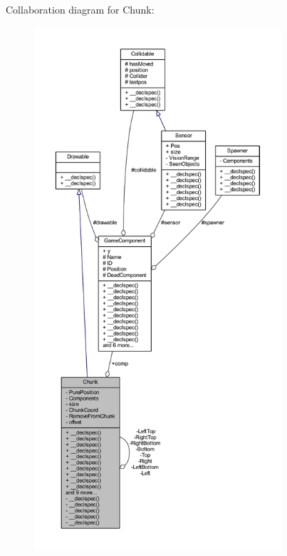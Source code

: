 Collaboration diagram for Chunk\-:
\nopagebreak
\begin{figure}[H]
\begin{center}
\leavevmode
\includegraphics[height=550pt]{class_chunk__coll__graph}
\end{center}
\end{figure}
